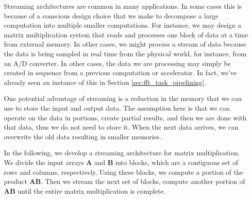 Streaming architectures are common in many applications.  In some cases this is because of a conscious design choice that we make to decompose a large computation into multiple smaller computations.  For instance, we may design a matrix multiplication system that reads and processes one block of data at a time from external memory.  In other cases, we might process a stream of data because the data is being sampled in real time from the physical world, for instance, from an A/D converter.  In other cases, the data we are processing may simply be created in sequence from a previous computation or accelerator.  In fact, we've already seen an instance of this in Section \ref{sec:fft_task_pipelining}.

One potential advantage of streaming is a reduction in the memory that we can use to store the input and output data. The assumption here is that we can operate on the data in portions, create partial results, and then we are done with that data, thus we do not need to store it. When the next data arrives, we can overwrite the old data resulting in smaller memories.

In the following, we develop a streaming architecture for matrix multiplication. We divide the input arrays $\mathbf{A}$ and $\mathbf{B}$ into blocks, which are a contiguous set of rows and columns, respectively. Using these blocks, we compute a portion of the product $\mathbf{AB}$. Then we stream the next set of blocks, compute another portion of $\mathbf{AB}$ until the entire matrix multiplication is complete.

